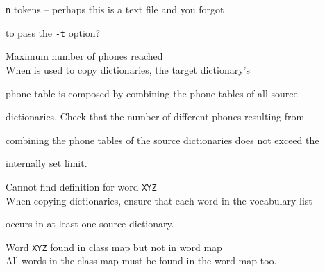 \begin{itemize}
\begin{itemize}
        {\tt n} tokens -- perhaps this is a text file and you forgot


        to pass the {\tt -t} option?


\end{itemize}















\begin{itemize}


 Maximum number of phones reached\\


        When  is used to copy dictionaries, the target dictionary's


        phone table is composed by combining the phone tables of all source


        dictionaries. Check that the number of different phones resulting from


        combining the phone tables of the source dictionaries does not exceed the


        internally set limit.





 Cannot find definition for word {\tt XYZ}\\


        When copying dictionaries, ensure that each word in the vocabulary list


        occurs in at least one source dictionary.


\end{itemize}















\begin{itemize}


 Word {\tt XYZ} found in class map but not in word map\\


        All words in the class map must be found in the word map too.






\end{itemize}
\end{itemize}
